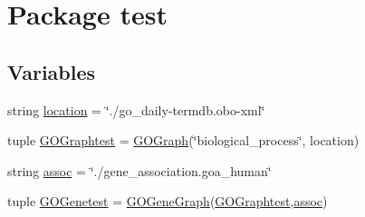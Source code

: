 \hypertarget{namespacetest}{
\section{Package test}
\label{namespacetest}
}
\subsection*{Variables}
\begin{DoxyCompactItemize}
\item 
string \hyperlink{namespacetest_a4ee7d63d9426ae32ba96ad2f0e171511}{location} = \char`\"{}./go\_\-daily-\/termdb.obo-\/xml\char`\"{}
\item 
tuple \hyperlink{namespacetest_a49256f3800de70e9aabf11ea0c3bb8e1}{GOGraphtest} = \hyperlink{class_g_o_graph_1_1_g_o_graph}{GOGraph}(\char`\"{}biological\_\-process\char`\"{}, location)
\item 
string \hyperlink{namespacetest_adb8b1e2a5df72522e42bc012571e75cd}{assoc} = \char`\"{}./gene\_\-association.goa\_\-human\char`\"{}
\item 
tuple \hyperlink{namespacetest_ab48a47ac8dcf21d32cff24c492f085c1}{GOGenetest} = \hyperlink{class_g_o_gene_graph_1_1_g_o_gene_graph}{GOGeneGraph}(\hyperlink{namespacetest_a49256f3800de70e9aabf11ea0c3bb8e1}{GOGraphtest},\hyperlink{namespacetest_adb8b1e2a5df72522e42bc012571e75cd}{assoc})
\end{DoxyCompactItemize}


